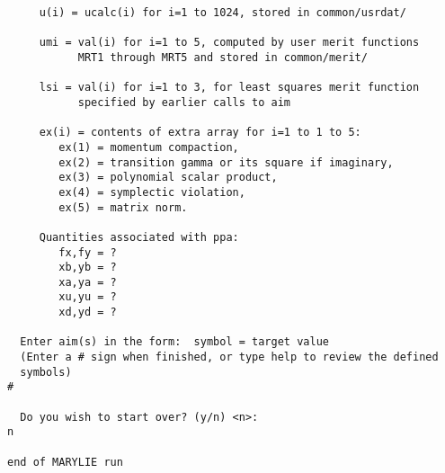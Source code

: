\begin{footnotesize}
\begin{verbatim}
     u(i) = ucalc(i) for i=1 to 1024, stored in common/usrdat/

     umi = val(i) for i=1 to 5, computed by user merit functions
           MRT1 through MRT5 and stored in common/merit/

     lsi = val(i) for i=1 to 3, for least squares merit function
           specified by earlier calls to aim

     ex(i) = contents of extra array for i=1 to 1 to 5:
        ex(1) = momentum compaction,
        ex(2) = transition gamma or its square if imaginary,
        ex(3) = polynomial scalar product,
        ex(4) = symplectic violation,
        ex(5) = matrix norm.

     Quantities associated with ppa:
        fx,fy = ?
        xb,yb = ?
        xa,ya = ?
        xu,yu = ?
        xd,yd = ?

  Enter aim(s) in the form:  symbol = target value
  (Enter a # sign when finished, or type help to review the defined
  symbols)
#

  Do you wish to start over? (y/n) <n>:
n

end of MARYLIE run

\end{verbatim}
\end{footnotesize}

\newpage
